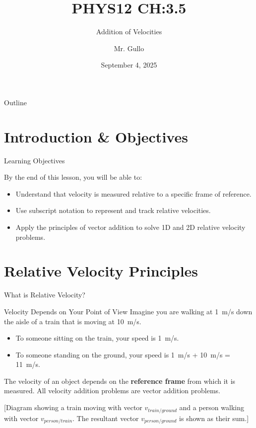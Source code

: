 \documentclass{beamer}
\title[Relative Velocity]{PHYS12 CH:3.5}
\subtitle{Addition of Velocities}
\author[Mr. Gullo]{Mr. Gullo}
\date[Sep 4, 2025]{September 4, 2025}
\begin{document}
\frame{\titlepage}

\begin{frame}{Outline}
    \tableofcontents
\end{frame}

\section{Introduction \& Objectives}

\begin{frame}{Learning Objectives}
    \begin{block}{By the end of this lesson, you will be able to:}
        \begin{itemize}
            \item Understand that velocity is measured relative to a specific frame of reference.
            \item Use subscript notation to represent and track relative velocities.
            \item Apply the principles of vector addition to solve 1D and 2D relative velocity problems.
        \end{itemize}
    \end{block}
\end{frame}

\section{Relative Velocity Principles}

\begin{frame}{What is Relative Velocity?}
    \begin{block}{Velocity Depends on Your Point of View}
        Imagine you are walking at \SI{1}{m/s} down the aisle of a train that is moving at \SI{10}{m/s}.
        \begin{itemize}
            \item To someone sitting on the train, your speed is \SI{1}{m/s}.
            \item To someone standing on the ground, your speed is \SI{1}{m/s} + \SI{10}{m/s} = \SI{11}{m/s}.
        \end{itemize}
        The velocity of an object depends on the \textbf{reference frame} from which it is measured. All velocity addition problems are vector addition problems.
    \end{block}
    
    \begin{center}
    \alert{[Diagram showing a train moving with vector $v_{train/ground}$ and a person walking with vector $v_{person/train}$. The resultant vector $v_{person/ground}$ is shown as their sum.]}
    \end{center}
\end{frame}
\end{document}
